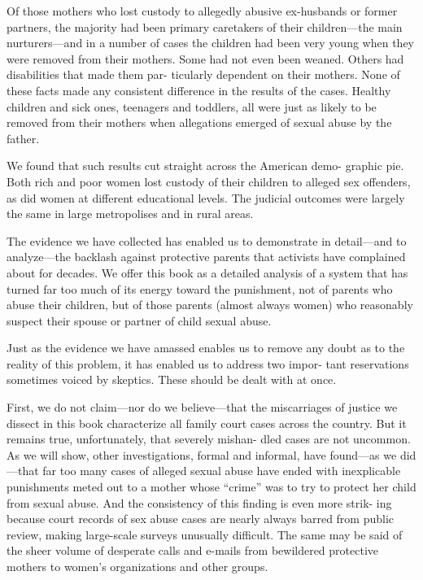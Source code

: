 Of those mothers who lost custody to allegedly abusive ex-husbands
or former partners, the majority had been primary caretakers of their
children—the main nurturers—and in a number of cases the children
had been very young when they were removed from their mothers. Some
had not even been weaned. Others had disabilities that made them par-
ticularly dependent on their mothers. None of these facts made any
consistent difference in the results of the cases. Healthy children and
sick ones, teenagers and toddlers, all were just as likely to be removed
from their mothers when allegations emerged of sexual abuse by the
father. \pfl{}



We found that such results cut straight across the American demo-
graphic pie. Both rich and poor women lost custody of their children
to alleged sex offenders, as did women at different educational levels.
The judicial outcomes were largely the same in large metropolises and
in rural areas. \pfl{}


The evidence we have collected has enabled us to demonstrate in
detail—and to analyze—the backlash against protective parents that
activists have complained about for decades. We offer this book as a
detailed analysis of a system that has turned far too much of its energy
toward the punishment, not of parents who abuse their children, but
of those parents (almost always women) who reasonably suspect their
spouse or partner of child sexual abuse. \pfl{}


Just as the evidence we have amassed enables us to remove any doubt
as to the reality of this problem, it has enabled us to address two impor-
tant reservations sometimes voiced by skeptics. These should be dealt
with at once. \pfl{}


First, we do not claim—nor do we believe—that the miscarriages of
justice we dissect in this book characterize all family court cases across
the country. But it remains true, unfortunately, that severely mishan-
dled cases are not uncommon. As we will show, other investigations,
formal and informal, have found—as we did—that far too many cases of
alleged sexual abuse have ended with inexplicable punishments meted
out to a mother whose “crime” was to try to protect her child from
sexual abuse. And the consistency of this finding is even more strik-
ing because court records of sex abuse cases are nearly always barred
from public review, making large-scale surveys unusually difficult. The
same may be said of the sheer volume of desperate calls and e-mails
from bewildered protective mothers to women’s organizations and other
groups. \pfl{}



